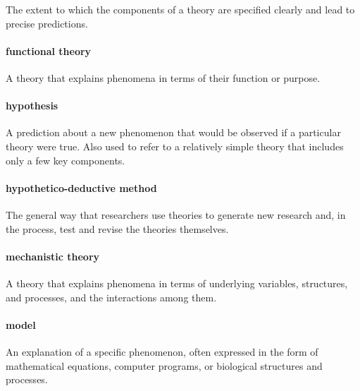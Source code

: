 \documentclass[
]{krantz}
\begin{document}
The extent to which the components of a theory are specified clearly and lead to precise predictions.

\hypertarget{functional-theory}{%
\paragraph*{functional theory}\label{functional-theory}}

A theory that explains phenomena in terms of their function or purpose.

\hypertarget{hypothesis}{%
\paragraph*{hypothesis}\label{hypothesis}}

A prediction about a new phenomenon that would be observed if a particular theory were true. Also used to refer to a relatively simple theory that includes only a few key components.

\hypertarget{hypothetico-deductive-method}{%
\paragraph*{hypothetico-deductive method}\label{hypothetico-deductive-method}}

The general way that researchers use theories to generate new research and, in the process, test and revise the theories themselves.

\hypertarget{mechanistic-theory}{%
\paragraph*{mechanistic theory}\label{mechanistic-theory}}

A theory that explains phenomena in terms of underlying variables, structures, and processes, and the interactions among them.

\hypertarget{model}{%
\paragraph*{model}\label{model}}

An explanation of a specific phenomenon, often expressed in the form of mathematical equations, computer programs, or biological structures and processes.
\end{document}
